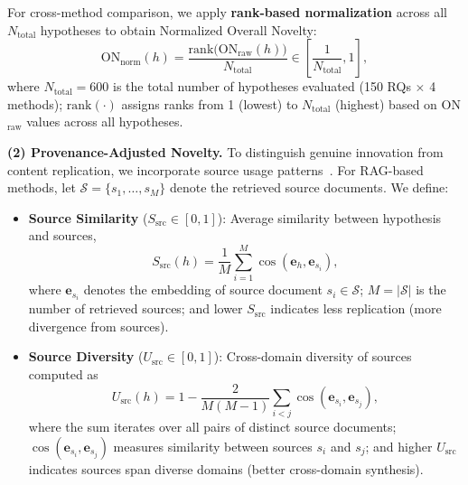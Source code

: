\documentclass[runningheads]{llncs}
\begin{document}
For cross-method comparison, we apply \textbf{rank-based normalization} across all $N_{\text{total}}$ hypotheses to obtain Normalized Overall Novelty:
\begin{equation}
    \text{ON}_{\text{norm}}(h) = \frac{\text{rank}\big(\text{ON}_{\text{raw}}(h)\big)}{N_{\text{total}}} \in \left[\frac{1}{N_{\text{total}}}, 1\right],
    \label{eq:on_norm}
\end{equation}
where $N_{\text{total}} = 600$ is the total number of hypotheses evaluated (150 RQs $\times$ 4 methods); $\text{rank}(\cdot)$ assigns ranks from 1 (lowest) to $N_{\text{total}}$ (highest) based on ON$_{\text{raw}}$ values across all hypotheses.

\textbf{(2) Provenance-Adjusted Novelty.} To distinguish genuine innovation from content replication, we incorporate source usage patterns~\cite{lewis2020retrieval}. For RAG-based methods, let $\mathcal{S} = \{s_1, \ldots, s_M\}$ denote the retrieved source documents. We define:

\begin{itemize}[leftmargin=*, itemsep=2pt]
    \item \textbf{Source Similarity} ($S_{\text{src}} \in [0, 1]$): Average similarity between hypothesis and sources,
    \begin{equation}
        S_{\text{src}}(h) = \frac{1}{M} \sum_{i=1}^{M} \cos(\mathbf{e}_h, \mathbf{e}_{s_i}),
        \label{eq:s_src}
    \end{equation}
    where $\mathbf{e}_{s_i}$ denotes the embedding of source document $s_i \in \mathcal{S}$; $M = |\mathcal{S}|$ is the number of retrieved sources; and lower $S_{\text{src}}$ indicates less replication (more divergence from sources).
    
    \item \textbf{Source Diversity} ($U_{\text{src}} \in [0, 1]$): Cross-domain diversity of sources computed as~\cite{zeng2021fresh,shi2023surprising}
    \begin{equation}
        U_{\text{src}}(h) = 1 - \frac{2}{M(M-1)} \sum_{i<j} \cos(\mathbf{e}_{s_i}, \mathbf{e}_{s_j}),
        \label{eq:u_src}
    \end{equation}
    where the sum iterates over all pairs of distinct source documents; $\cos(\mathbf{e}_{s_i}, \mathbf{e}_{s_j})$ measures similarity between sources $s_i$ and $s_j$; and higher $U_{\text{src}}$ indicates sources span diverse domains (better cross-domain synthesis).
\end{itemize}
\end{document}
